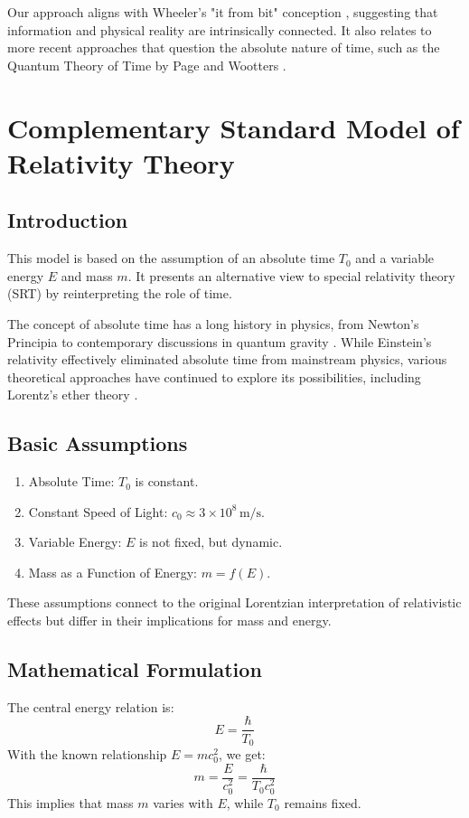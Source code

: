 \documentclass[a4paper,12pt]{article}
\newcommand{\Tzero}{T_0}
\begin{document}
	Our approach aligns with Wheeler's "it from bit" conception \cite{Wheeler1990}, suggesting that information and physical reality are intrinsically connected. It also relates to more recent approaches that question the absolute nature of time, such as the Quantum Theory of Time by Page and Wootters \cite{Page1983}.
	
	\section{Complementary Standard Model of Relativity Theory}
	
	\subsection{Introduction}
	This model is based on the assumption of an absolute time $\Tzero$ and a variable energy $E$ and mass $m$. It presents an alternative view to special relativity theory (SRT) by reinterpreting the role of time.
	
	The concept of absolute time has a long history in physics, from Newton's Principia \cite{Newton1687} to contemporary discussions in quantum gravity \cite{Anderson2010}. While Einstein's relativity \cite{Einstein1905} effectively eliminated absolute time from mainstream physics, various theoretical approaches have continued to explore its possibilities, including Lorentz's ether theory \cite{Lorentz1904}.
	
	\subsection{Basic Assumptions}
	\begin{enumerate}[leftmargin=*,nosep]
		\item Absolute Time: $\Tzero$ is constant.
		\item Constant Speed of Light: $c_0 \approx 3 \times 10^8 \, \text{m/s}$.
		\item Variable Energy: $E$ is not fixed, but dynamic.
		\item Mass as a Function of Energy: $m = f(E)$.
	\end{enumerate}
	
	These assumptions connect to the original Lorentzian interpretation of relativistic effects \cite{Lorentz1904} but differ in their implications for mass and energy.
	
	\subsection{Mathematical Formulation}
	The central energy relation is:
	\[
	E = \frac{\hbar}{\Tzero}
	\]
	With the known relationship $E = m c_0^2$, we get:
	\[
	m = \frac{E}{c_0^2} = \frac{\hbar}{\Tzero c_0^2}
	\]
	This implies that mass $m$ varies with $E$, while $\Tzero$ remains fixed.
	
\end{document}
